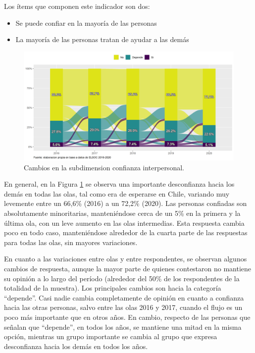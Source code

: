 \documentclass[
  12pt,
]{book}
\begin{document}
Los ítems que componen este indicador son dos:

\begin{itemize}
\item
  Se puede confiar en la mayoría de las personas
\item
  La mayoría de las personas tratan de ayudar a las demás
\end{itemize}

\begin{figure}[H]

{\centering \includegraphics[width=1\linewidth,height=1\textheight]{output/graphs/alluvial_conf_interpersonal} 

}

\caption{Cambios en la subdimension confianza interpersonal.}\label{fig:alluvial-conf-interpersonal}
\end{figure}

En general, en la Figura \ref{fig:alluvial-conf-interpersonal} se observa una importante desconfianza hacia los demás en todas las olas, tal como era de esperarse en Chile, variando muy levemente entre un 66,6\% (2016) a un 72,2\% (2020). Las personas confiadas son absolutamente minoritarias, manteniéndose cerca de un 5\% en la primera y la última ola, con un leve aumento en las olas intermedias. Esta respuesta cambia poco en todo caso, manteniéndose alrededor de la cuarta parte de las respuestas para todas las olas, sin mayores variaciones.

En cuanto a las variaciones entre olas y entre respondentes, se observan algunos cambios de respuesta, aunque la mayor parte de quienes contestaron no mantiene su opinión a lo largo del período (alrededor del 50\% de los respondentes de la totalidad de la muestra). Los principales cambios son hacia la categoría ``depende''. Casi nadie cambia completamente de opinión en cuanto a confianza hacia las otras personas, salvo entre las olas 2016 y 2017, cuando el flujo es un poco más importante que en otros años. En cambio, respecto de las personas que señalan que ``depende'', en todos los años, se mantiene una mitad en la misma opción, mientras un grupo importante se cambia al grupo que expresa desconfianza hacia los demás en todos los años.
\end{document}
